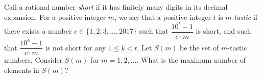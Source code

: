 Call a rational number \emph{short} if it has finitely many digits in its decimal expansion. For a positive integer $m$, we say that a positive integer $t$ is $m$-\emph{tastic} if there exists a number $c \in \{1, 2, 3, \ldots, 2017\}$ such that $\dfrac{10^t - 1}{c \cdot m}$ is short, and such that $\dfrac{10^k - 1}{c \cdot m}$ is not short for any $1 \leq k < t$. Let $S(m)$ be the set of $m$-tastic numbers. Consider $S(m)$ for $m = 1, 2, \ldots$. What is the maximum number of elements in $S(m)$?
